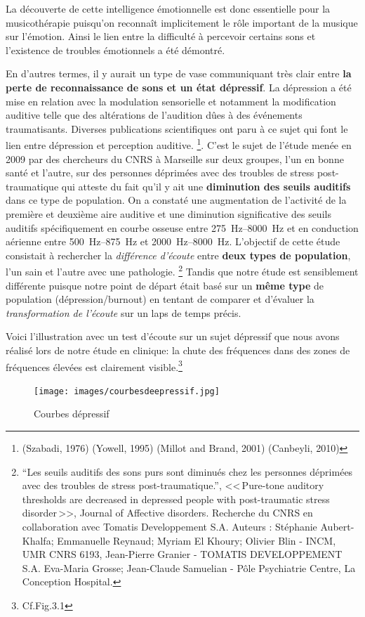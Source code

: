 La découverte de cette intelligence  émotionnelle est donc essentielle  pour la 
musicothérapie puisqu'on reconnaît implicitement le rôle important de la musique sur 
l'émotion.   
Ainsi le lien entre la difficulté à percevoir certains sons 
et l'existence 
de troubles émotionnels a été démontré.

En d'autres termes, il y
aurait un type de vase communiquant très clair entre\textbf{ la perte de reconnaissance de sons et
un état dépressif}. La dépression a été mise en relation avec la
modulation sensorielle et notamment la modification auditive telle que
des altérations de l'audition dûes à des événements
traumatisants. Diverses publications scientifiques ont paru à ce
sujet qui font le lien entre dépression et perception auditive.
\footnote{(Szabadi, 1976) (Yowell, 1995) (Millot and Brand, 2001)
  (Canbeyli, 2010)}.
C'est le sujet de l'étude menée en 2009 par des chercheurs du CNRS à Marseille sur deux
groupes, l'un en bonne santé et l'autre,
sur des personnes déprimées avec des troubles de stress
post-traumatique qui atteste du 
fait qu'il y ait une\textbf{ diminution des seuils auditifs} dans ce type de
population. On a constaté une augmentation de l'activité de la
première et deuxième aire auditive et une diminution significative des
seuils auditifs spécifiquement en courbe osseuse entre
\SIrange{275}{8000}{\Hz} et en conduction aérienne entre
\SIrange{500}{875}{\Hz} et  \SIrange{2000}{8000}{\Hz}.
L'objectif de 
cette étude consistait  à rechercher la\textit{ différence d'écoute} entre
\textbf{deux types de population}, l'un sain et l'autre avec une pathologie. \footnote{``Les seuils auditifs des sons purs 
	sont diminués chez les personnes déprimées avec des
	troubles de stress post-traumatique.'', <<\,Pure-tone auditory 
	thresholds are decreased in depressed people with post-traumatic stress 
disorder\,>>, Journal of Affective disorders. Recherche du CNRS en collaboration
	avec Tomatis Developpement S.A. Auteurs : Stéphanie 
	Aubert-Khalfa; Emmanuelle Reynaud; Myriam El Khoury;
	Olivier Blin - INCM, UMR CNRS 6193, Jean-Pierre Granier -
	TOMATIS DEVELOPPEMENT S.A. Eva-Maria Grosse; Jean-Claude 
	Samuelian - Pôle Psychiatrie Centre, La Conception Hospital.}
Tandis que notre étude est sensiblement différente puisque notre point de départ était basé sur 
un \textbf{même type} de
population (dépression/burnout) en tentant de comparer et d'évaluer
la\textit{ transformation de l'écoute} sur un laps de temps précis.

Voici l'illustration avec un test
d'écoute sur un sujet dépressif que nous avons réalisé lors de notre
étude en clinique: la
chute des fréquences dans des zones de fréquences élevées est
clairement visible.\footnote{Cf.Fig.3.1}
 \begin{figure}
	\centering
	\texttt{[image: images/courbesdeepressif.jpg]}
	\caption{Courbes dépressif}
	\label{fig:courbes du dépressif}
      \end{figure}


